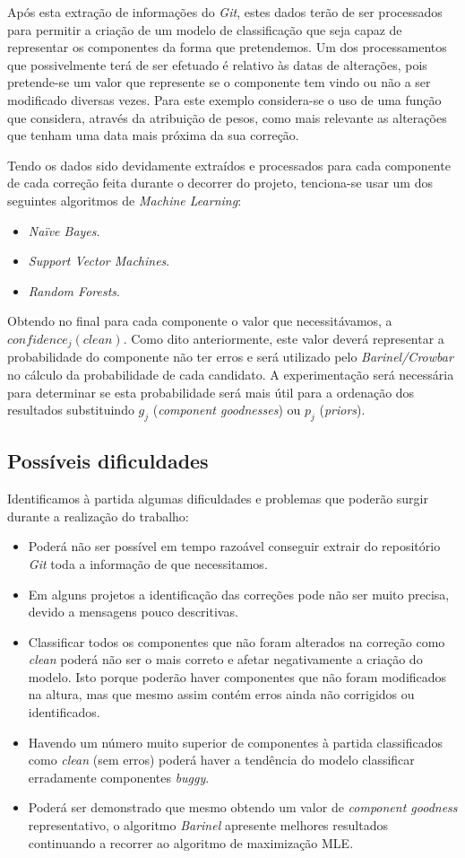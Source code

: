 Após esta extração de informações do \emph{Git}, estes dados terão de ser processados para permitir a criação de um modelo de classificação que seja capaz de representar os componentes da forma que pretendemos. Um dos processamentos que possivelmente terá de ser efetuado é relativo às datas de alterações, pois pretende-se um valor que represente se o componente tem vindo ou não a ser modificado diversas vezes. Para este exemplo considera-se o uso de uma função que considera, através da atribuição de pesos, como mais relevante as alterações que tenham uma data mais próxima da sua correção.

Tendo os dados sido devidamente extraídos e processados para cada componente de cada correção feita durante o decorrer do projeto, tenciona-se usar um dos seguintes algoritmos de \emph{Machine Learning}:
%
\begin{itemize}
	\item \emph{Naïve Bayes}.
	\item \emph{Support Vector Machines}.
	\item \emph{Random Forests}.
\end{itemize}

Obtendo no final para cada componente o valor que necessitávamos, a $confidence_j(clean)$. Como dito anteriormente, este valor deverá representar a probabilidade do componente não ter erros e será utilizado pelo \emph{Barinel/Crowbar} no cálculo da probabilidade de cada candidato. A experimentação será necessária para determinar se esta probabilidade será mais útil para a ordenação dos resultados substituindo $g_j$ (\emph{component goodnesses}) ou $p_j$ (\emph{priors}).

\subsection{Possíveis dificuldades}

Identificamos à partida algumas dificuldades e problemas que poderão surgir durante a realização do trabalho:
%
\begin{itemize}
	\item Poderá não ser possível em tempo razoável conseguir extrair do repositório \emph{Git} toda a informação de que necessitamos.
	\item Em alguns projetos a identificação das correções pode não ser muito precisa, devido a mensagens pouco descritivas.
	\item Classificar todos os componentes que não foram alterados na correção como \emph{clean} poderá não ser o mais correto e afetar negativamente a criação do modelo. Isto porque poderão haver componentes que não foram modificados na altura, mas que mesmo assim contém erros ainda não corrigidos ou identificados.
	\item Havendo um número muito superior de componentes à partida classificados como \emph{clean} (sem erros) poderá haver a tendência do modelo classificar erradamente componentes \emph{buggy}.
	\item Poderá ser demonstrado que mesmo obtendo um valor de \emph{component goodness} representativo, o algoritmo \emph{Barinel} apresente melhores resultados continuando a recorrer ao algoritmo de maximização MLE.
\end{itemize}